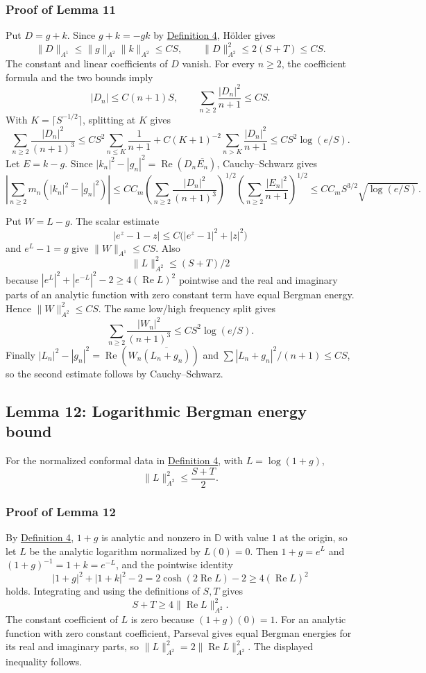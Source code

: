 \documentclass[11pt]{article}
\begin{document}
\subsubsection{Proof of Lemma 11}\label{proof-lem-frequency-replacement}

Put \(D=g+k\). Since \(g+k=-gk\) by
\hyperref[def-conformal-data]{Definition 4}, Hölder gives \[
\|D\|_{A^1}\le \|g\|_{A^2}\|k\|_{A^2}\le CS,
\qquad
\|D\|_{A^2}^2\le2(S+T)\le CS.
\] The constant and linear coefficients of \(D\) vanish. For every
\(n\ge2\), the coefficient formula and the two bounds imply \[
|D_n|\le C(n+1)S,
\qquad
\sum_{n\ge2}\frac{|D_n|^2}{n+1}\le CS.
\] With \(K=\lceil S^{-1/2}\rceil\), splitting at \(K\) gives \[
\sum_{n\ge2}\frac{|D_n|^2}{(n+1)^3}
\le C S^2\sum_{n\le K}\frac1{n+1}
 +C(K+1)^{-2}\sum_{n>K}\frac{|D_n|^2}{n+1}
\le CS^2\log(e/S).
\] Let \(E=k-g\). Since
\(|k_n|^2-|g_n|^2=\operatorname{Re}(D_n\overline{E_n})\),
Cauchy--Schwarz gives \[
\left|\sum_{n\ge2}m_n(|k_n|^2-|g_n|^2)\right|
\le C C_m
\left(\sum_{n\ge2}\frac{|D_n|^2}{(n+1)^3}\right)^{1/2}
\left(\sum_{n\ge2}\frac{|E_n|^2}{n+1}\right)^{1/2}
\le C C_m S^{3/2}\sqrt{\log(e/S)}.
\]

Put \(W=L-g\). The scalar estimate \[
|e^z-1-z|\le C\bigl(|e^z-1|^2+|z|^2\bigr)
\] and \(e^L-1=g\) give \(\|W\|_{A^1}\le CS\). Also \[
\|L\|_{A^2}^2\le(S+T)/2
\] because \(|e^L|^2+|e^{-L}|^2-2\ge4(\operatorname{Re}L)^2\) pointwise
and the real and imaginary parts of an analytic function with zero
constant term have equal Bergman energy. Hence \(\|W\|_{A^2}^2\le CS\).
The same low/high frequency split gives \[
\sum_{n\ge2}\frac{|W_n|^2}{(n+1)^3}\le CS^2\log(e/S).
\] Finally
\(|L_n|^2-|g_n|^2=\operatorname{Re}(W_n\overline{(L_n+g_n)})\) and
\(\sum|L_n+g_n|^2/(n+1)\le CS\), so the second estimate follows by
Cauchy--Schwarz.

\subsection{Lemma 12: Logarithmic Bergman energy
bound}\label{lem-log-energy-bound}

For the normalized conformal data in
\hyperref[def-conformal-data]{Definition 4}, with \(L=\log(1+g)\), \[
\|L\|_{A^2}^2\le\frac{S+T}{2}.
\]

\subsubsection{Proof of Lemma 12}\label{proof-lem-log-energy-bound}

By \hyperref[def-conformal-data]{Definition 4}, \(1+g\) is analytic and
nonzero in \(\mathbb D\) with value \(1\) at the origin, so let \(L\) be
the analytic logarithm normalized by \(L(0)=0\). Then \(1+g=e^L\) and
\((1+g)^{-1}=1+k=e^{-L}\), and the pointwise identity \[
|1+g|^2+|1+k|^2-2
=2\cosh(2\operatorname{Re}L)-2
\ge4(\operatorname{Re}L)^2
\] holds. Integrating and using the definitions of \(S,T\) gives \[
S+T\ge4\|\operatorname{Re}L\|_{A^2}^2.
\] The constant coefficient of \(L\) is zero because \((1+g)(0)=1\). For
an analytic function with zero constant coefficient, Parseval gives
equal Bergman energies for its real and imaginary parts, so
\(\|L\|_{A^2}^2=2\|\operatorname{Re}L\|_{A^2}^2\). The displayed
inequality follows.
\end{document}

